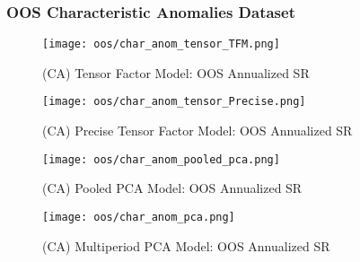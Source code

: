 \subsubsection{OOS Characteristic Anomalies Dataset}

\begin{figure}[H]
    \centering
    \texttt{[image: oos/char\_anom\_tensor\_TFM.png]}
    \caption{(CA) Tensor Factor Model: OOS Annualized SR}
    \label{fig:char_anom-oos-tfm}
\end{figure}

\begin{figure}[H]
    \centering
    \texttt{[image: oos/char\_anom\_tensor\_Precise.png]}
    \caption{(CA) Precise Tensor Factor Model: OOS Annualized SR}
    \label{fig:char_anom-oos-precise}
\end{figure}

\begin{figure}[H]
    \centering
    \texttt{[image: oos/char\_anom\_pooled\_pca.png]}
    \caption{(CA) Pooled PCA Model: OOS Annualized SR}
    \label{fig:char_anom-oos-pooled-pca}
\end{figure}

\begin{figure}[H]
    \centering
    \texttt{[image: oos/char\_anom\_pca.png]}
    \caption{(CA) Multiperiod PCA Model: OOS Annualized SR}
    \label{fig:char_anom-oos-pca}
\end{figure}
